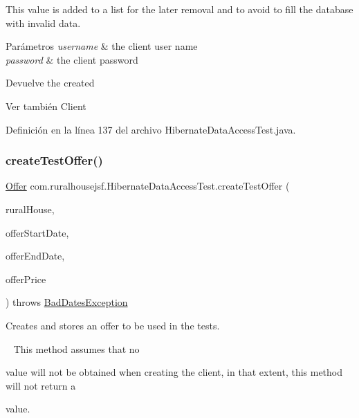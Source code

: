 This value is added to a list for the later removal and to avoid to fill the database with invalid data.


\begin{DoxyParams}{Parámetros}
{\em username} & the client user name \\
\hline
{\em password} & the client password\\
\hline
\end{DoxyParams}
\begin{DoxyReturn}{Devuelve}
the created
\begin{DoxyCode}{0}
\end{DoxyCode}

\end{DoxyReturn}
\begin{DoxySeeAlso}{Ver también}
Client 
\end{DoxySeeAlso}


Definición en la línea 137 del archivo Hibernate\+Data\+Access\+Test.\+java.

\mbox{\label{a00272_adb47ff6c8ba0fc7e7327407a8c937c4a}} 
\subsubsection{\texorpdfstring{createTestOffer()}{createTestOffer()}}
{\footnotesize\ttfamily \mbox{\hyperlink{a00184}{Offer}} com.\+ruralhousejsf.\+Hibernate\+Data\+Access\+Test.\+create\+Test\+Offer (\begin{DoxyParamCaption}\item[{\mbox{\hyperlink{a00188}{Rural\+House}}}]{rural\+House,  }\item[{Local\+Date}]{offer\+Start\+Date,  }\item[{Local\+Date}]{offer\+End\+Date,  }\item[{double}]{offer\+Price }\end{DoxyParamCaption}) throws \mbox{\hyperlink{a00208}{Bad\+Dates\+Exception}}\hspace{0.3cm}{\ttfamily [private]}}



Creates and stores an offer to be used in the tests. 

~\newline
 This method assumes that no
\begin{DoxyCode}{0}
\DoxyCodeLine{\textcolor{keyword}{null} }
\end{DoxyCode}
 value will not be obtained when creating the client, in that extent, this method will not return a 
\begin{DoxyCode}{0}
\DoxyCodeLine{\textcolor{keyword}{null} }
\end{DoxyCode}
 value. 

